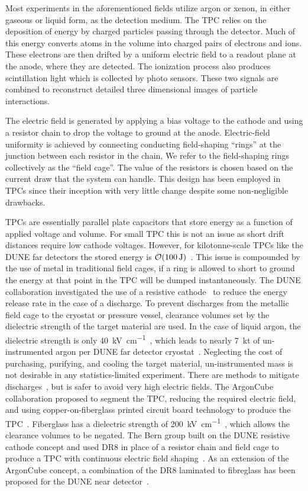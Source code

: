 \documentclass[a4paper,12pt]{article}
\newcommand{\DR}{DR8}
\begin{document}
Most experiments in the aforementioned fields utilize argon or xenon, in either gaseous or liquid form, as the detection medium. 
The TPC relies on the deposition of energy by charged particles passing through the detector. 
Much of this energy converts atoms in the volume into charged pairs of electrons and ions. 
These electrons are then drifted by a uniform electric field to a readout plane at the anode, where they are detected. 
The ionization process also produces scintillation light which is collected by photo sensors. 
These two signals are combined to reconstruct detailed three dimensional images of particle interactions.

The electric field is generated by applying a bias voltage to the cathode and using a resistor chain to drop the voltage to ground at the anode.  
Electric-field uniformity is achieved by connecting conducting field-shaping ``rings'' at the junction between each resistor in the chain, We refer to the field-shaping rings collectively as the ``field cage''. 
The value of the resistors is chosen based on the current draw that the system can handle.
This design has been employed in TPCs since their inception with very little change despite some non-negligible drawbacks. 

TPCs are essentially parallel plate capacitors that store energy as a function of applied voltage and volume. 
For small TPC this is not an issue as short drift distances require low cathode voltages.
However, for kilotonne-scale TPCs like the DUNE far detectors the stored energy is $\order{\SI{100}{\joule}}$~\cite{Acciarri:2016ooe}.
This issue is compounded by the use of metal in traditional field cages, if a ring is allowed to short to ground the energy at that point in the TPC will be dumped instantaneously. 
The DUNE collaboration investigated the use of a resistive cathode~\cite{DUNE:2017pqt} to reduce the energy release rate in the case of a discharge.
To prevent discharges from the metallic field cage to the cryostat or pressure vessel, clearance volumes set by the dielectric strength of the target material are used. 
In the case of liquid argon, the dielectric strength is only \SI{40}{\kilo\volt\per\centi\metre}~\cite{MicroBooNE:2014php}, which leads to nearly \SI{7}{\kilo\tonne} of un-instrumented argon per DUNE far detector cryostat~\cite{Acciarri:2016ooe}.
Neglecting the cost of purchasing, purifying, and cooling the target material, un-instrumented mass is not desirable in any statistics-limited experiment.        
There are methods to mitigate discharges~\cite{Auger:2014eba}, but is safer to avoid very high electric fields.  
The ArgonCube collaboration proposed to segment the TPC, reducing the required electric field, and using copper-on-fiberglass printed circuit board technology to produce the TPC~\cite{Auger:2268439}. 
Fiberglass has a dielectric strength of \SI{200}{\kilo\volt\per\centi\metre}~\cite{5071132}, which allows the clearance volumes to be negated.
The Bern group built on the DUNE resistive cathode concept and used {\DR} in place of a resistor chain and field cage to produce a TPC with continuous electric field shaping~\cite{bern_lartpc}.
As an extension of the ArgonCube concept, a combination of the {\DR} laminated to fibreglass has been proposed for the DUNE near detector~\cite{DUNE:2021tad}.   
\end{document}
